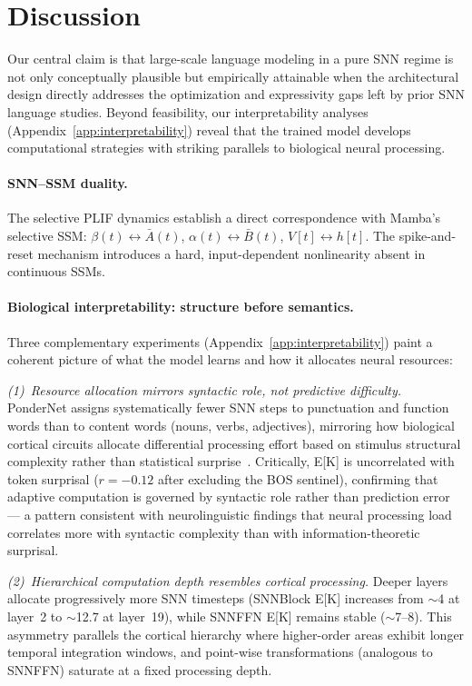 \documentclass{article}
\begin{document}
\section{Discussion}
\label{sec:discussion}

Our central claim is that large-scale language modeling in a pure SNN regime is not only conceptually plausible but empirically attainable when the architectural design directly addresses the optimization and expressivity gaps left by prior SNN language studies.
Beyond feasibility, our interpretability analyses (Appendix~\ref{app:interpretability}) reveal that the trained model develops computational strategies with striking parallels to biological neural processing.

\paragraph{SNN--SSM duality.}
The selective PLIF dynamics establish a direct correspondence with Mamba's selective SSM:
$\beta(t) \leftrightarrow \bar{A}(t)$, $\alpha(t) \leftrightarrow \bar{B}(t)$, $V[t] \leftrightarrow h[t]$.
The spike-and-reset mechanism introduces a hard, input-dependent nonlinearity absent in continuous SSMs.

\paragraph{Biological interpretability: structure before semantics.}
Three complementary experiments (Appendix~\ref{app:interpretability}) paint a coherent picture of what the model learns and how it allocates neural resources:

\emph{(1)~Resource allocation mirrors syntactic role, not predictive difficulty.}
PonderNet assigns systematically fewer SNN steps to punctuation and function words than to content words (nouns, verbs, adjectives), mirroring how biological cortical circuits allocate differential processing effort based on stimulus structural complexity rather than statistical surprise~\citep{carandini2012normalization}.
Critically, E[K] is uncorrelated with token surprisal ($r = -0.12$ after excluding the BOS sentinel), confirming that adaptive computation is governed by syntactic role rather than prediction error --- a pattern consistent with neurolinguistic findings that neural processing load correlates more with syntactic complexity than with information-theoretic surprisal.

\emph{(2)~Hierarchical computation depth resembles cortical processing.}
Deeper layers allocate progressively more SNN timesteps (SNNBlock E[K] increases from $\sim$4 at layer~2 to $\sim$12.7 at layer~19), while SNNFFN E[K] remains stable ($\sim$7--8).
This asymmetry parallels the cortical hierarchy where higher-order areas exhibit longer temporal integration windows, and point-wise transformations (analogous to SNNFFN) saturate at a fixed processing depth.
\end{document}
